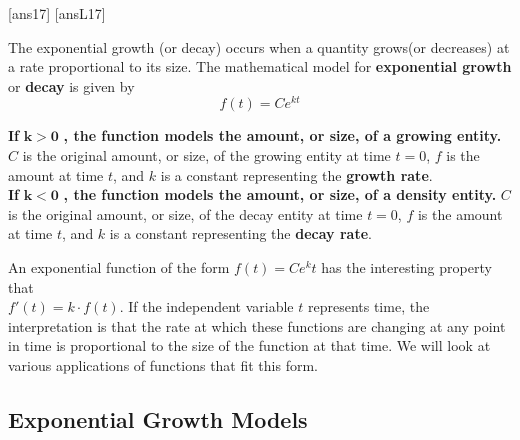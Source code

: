 \newpage
[ans17]
[ansL17]

\begin{tcolorbox}[title = {Exponential Growth and Decay Models}]

\noindent The exponential growth (or decay) occurs when a quantity grows(or decreases) at a rate proportional to its size. The mathematical model for \textbf{exponential growth} or \textbf{decay} is given by
\vspace{-0.2cm}
\begin{equation}
    f(t) = Ce^{kt}
\end{equation}

\textbf{If} $\bm{k>0}$ \textbf{, the function models the amount, or size, of a growing entity.} $C$ is the original amount, or size, of the growing entity at time $t=0$, $f$ is the amount at time $t$, and $k$ is a constant representing the \textbf{growth rate}.\\

\textbf{If} $\bm{k<0}$ \textbf{, the function models the amount, or size, of a density entity.} $C$ is the original amount, or size, of the decay entity at time $t=0$, $f$ is the amount at time $t$, and $k$ is a constant representing the \textbf{decay rate}.

\end{tcolorbox}

\noindent An exponential function of the form $f(t)=Ce^kt$ has the interesting property that\\ $f'(t)=k\cdot f(t)$.  If the independent variable $t$ represents time, the interpretation is that the rate at which these functions are changing at any point in time is proportional to the size of the function at that time.  We will look at various applications of functions that fit this form. 

\subsection*{Exponential Growth Models}

